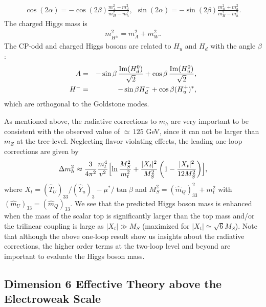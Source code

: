 \documentclass[preprint,3p,12pt]{elsarticle}
\begin{document}
{\begin{eqnarray}
\cos(2\alpha) = -\cos (2\beta) \frac{m_A^2-m_Z^2}{m_H^2-m_h^2}, \ \ 
\sin(2\alpha) = -\sin (2\beta)\frac{m_H^2 + m_h^2}{m_H^2-m_h^2}.
\end{eqnarray}
The charged Higgs mass is 
\begin{eqnarray}
m_{H^{\pm}}^2 = m_A^2 + m_W^2.
\end{eqnarray}
The CP-odd and charged Higgs bosons are related to $H_u$ and $H_d$ with the angle $\beta$:
\begin{eqnarray}
A &=& -\sin\beta \, \frac{{\rm Im}(H_d^0)}{\sqrt{2}} + \cos\beta \, \frac{{\rm Im}(H_u^0)}{\sqrt{2}}, \nonumber \\
H^{-} &=& -\sin\beta H_d^- + \cos\beta (H_u^+)^*, 
\end{eqnarray}
which are orthogonal to the Goldstone modes.


\vspace{10pt}
As mentioned above, 
the radiative corrections to $m_h$ are very important to be consistent with the observed value of $\simeq\, 125$ GeV, 
since it can not be larger than $m_Z$ at the tree-level. Neglecting flavor violating effects, the leading one-loop corrections are given by~\cite{Okada:1990vk, Ellis:1990nz, Haber:1990aw}
\begin{eqnarray}
\Delta m_h^2 \approx \frac{3}{4\pi^2} \frac{m_t^4}{v^2} \Bigl[
\ln  \frac{M_S^2}{m_t^2}  
+ \frac{|X_t|^2}{M_S^2} \left(1 - \frac{|X_t|^2}{12 M_S^2} \right)
\Bigr],
\end{eqnarray}
where $X_t = (\hat T_U)_{33}/ (\hat Y_u)_3 - \mu^*/\tan\beta $ and $M_S^2 = (\hat m_{Q})_{33}^2 + m_t^2$ with $(\hat m_{U})_{33} = (\hat m_{Q})_{33}$. 
We see that the predicted Higgs boson mass is enhanced when the mass of the scalar top is significantly larger than the top mass and/or the trilinear coupling is large as $|X_t| \gg M_S$ (maximized for $|X_t| \simeq \sqrt{6} M_S$). 
Note that although the above one-loop result show us insights about the radiative corrections, 
the higher order terms at the two-loop level and beyond are important to evaluate the Higgs boson mass.


\subsection{Dimension 6 Effective Theory above the Electroweak Scale }
\label{sec:Dim6}

}
\end{document}
